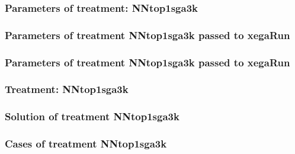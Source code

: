 \documentclass[18pt,c]{beamer}
\begin{document}
 \begin{frame}
 \fontsize{8pt}{9pt}\selectfont
 \frametitle{  Parameters of treatment: NNtop1sga3k 
 }

 \label{ExpDtParmTable003.tex}  
 \end{frame}


 \begin{frame}
 \fontsize{8pt}{9pt}\selectfont
 \frametitle{  Parameters of treatment NNtop1sga3k passed to xegaRun
 }

 \label{ExpDtParmTable004.tex}  
 \end{frame}


 \begin{frame}
 \fontsize{8pt}{9pt}\selectfont
 \frametitle{  Parameters of treatment NNtop1sga3k passed to xegaRun
 }

 \label{ExpDtParmTable005.tex}  
 \end{frame}

 \begin{frame}
 \fontsize{8pt}{9pt}\selectfont
 \frametitle{ Treatment: NNtop1sga3k }

 \label{ExpDStatsTable004.tex}  
 \end{frame}

 \begin{frame}
 \fontsize{8pt}{9pt}\selectfont
 \frametitle{ Solution of treatment NNtop1sga3k }

 \label{ExpDSolutionTable002.tex}  
 \end{frame}

 \begin{frame}
 \fontsize{8pt}{9pt}\selectfont
 \frametitle{ Cases of treatment NNtop1sga3k }

 \label{ExpDSolutionTable003.tex}  
 \end{frame}
\end{document}
